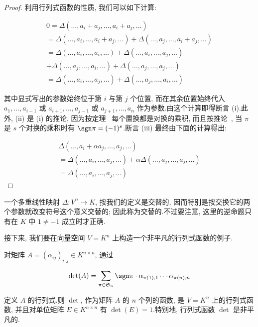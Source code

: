 \begin{proof}
利用行列式函数的性质, 我们可以如下计算:

\[
\begin{array}{l}
0 = \varDelta(\ldots, a_i + a_j, \ldots, a_i + a_j, \ldots) \\
= \varDelta(\ldots, a_i, \ldots, a_i + a_j, \ldots) + \varDelta(\ldots, a_j, \ldots, a_i + a_j, \ldots) \\
= \varDelta(\ldots, a_i, \ldots, a_i, \ldots) + \varDelta(\ldots, a_i, \ldots, a_j, \ldots) \\
+ \varDelta(\ldots, a_j, \ldots, a_i, \ldots) + \varDelta(\ldots, a_j, \ldots, a_j, \ldots) \\
= \varDelta(\ldots, a_i, \ldots, a_j, \ldots) + \varDelta(\ldots, a_j, \ldots, a_i, \ldots)
\end{array}
\]

其中显式写出的参数始终位于第 $i$ 与第 $j$ 个位置, 而在其余位置始终代入 $a_1, \ldots, a_{i-1}$ 或 $a_{i+1}, \ldots, a_{j-1}$ 或 $a_{j+1}, \ldots, a_n$ 作为参数.由这个计算即得断言 (i).此外, (ii) 是 (i) 的推论, 因为按定理~ 每个置换都是对换的乘积, 而且按推论~, 当 $\pi$ 是 $s$ 个对换的乘积时有 $\sgn \pi = (-1)^s$.断言 (iii) 最终由下面的计算得出:

\[
\begin{array}{c}
\varDelta(\ldots, a_i + \alpha a_j, \ldots, a_j, \ldots) \\
= \varDelta(\ldots, a_i, \ldots, a_j, \ldots) + \alpha \varDelta(\ldots, a_j, \ldots, a_j, \ldots) \\
= \varDelta(\ldots, a_i, \ldots, a_j, \ldots)
\end{array}
\]
\end{proof}

一个多重线性映射 $\varDelta \colon V^n \longrightarrow K$, 按我们的定义是交替的, 因而特别是按交换它的两个参数就改变符号这个意义交替的; 因此称为交替的.不过要注意, 这里的逆命题只有在 $K$ 中 $1 \neq -1$ 成立时才正确.

接下来, 我们要在向量空间 $V = K^n$ 上构造一个非平凡的行列式函数的例子.

\begin{lemma}\label{lem:4.2.4}
对矩阵 $A = (\alpha_{ij})_{i, j} \in K^{n \times n}$, 通过

\[
\det(A) = \sum_{\pi \in \mathfrak{S}_n} \sgn \pi \cdot \alpha_{\pi(1), 1} \cdots \alpha_{\pi(n), n}
\]

定义 $A$ 的行列式.则 $\det$, 作为矩阵 $A$ 的 $n$ 个列的函数, 是 $V = K^n$ 上的行列式函数, 并且对单位矩阵 $E \in K^{n \times n}$ 有 $\det(E) = 1$.特别地, 行列式函数 $\det$ 是非平凡的.
\end{lemma}

